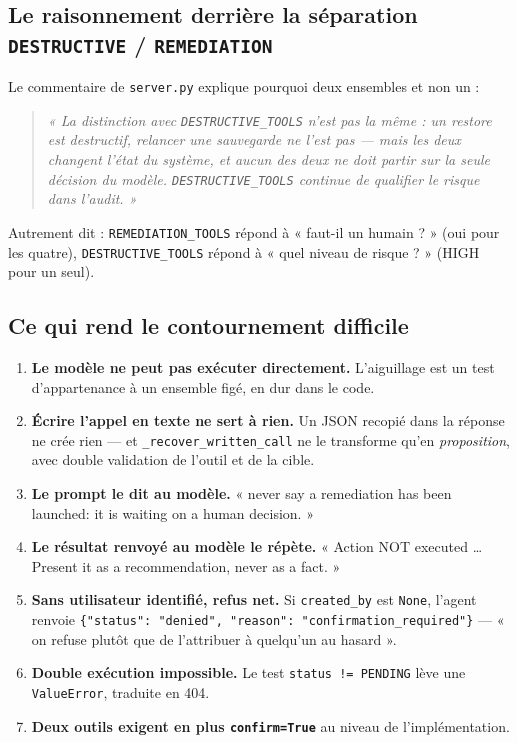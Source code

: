 \documentclass[11pt,a4paper]{report}
\newcommand{\file}[1]{\texttt{\small #1}}
\newcommand{\fn}[1]{\texttt{\small\textcolor{oasisviolet}{#1}}}
\newcommand{\cls}[1]{\texttt{\small\textcolor{oasisblue}{#1}}}
\begin{document}
\subsection{Le raisonnement derrière la séparation \texttt{DESTRUCTIVE} / \texttt{REMEDIATION}}

Le commentaire de \file{server.py} explique pourquoi deux ensembles et non un :

\begin{quote}
\itshape
« La distinction avec \texttt{DESTRUCTIVE\_TOOLS} n'est pas la même : un restore
est destructif, relancer une sauvegarde ne l'est pas --- mais les deux changent
l'état du système, et aucun des deux ne doit partir sur la seule décision du
modèle. \texttt{DESTRUCTIVE\_TOOLS} continue de qualifier le risque dans
l'audit. »
\end{quote}

\noindent
Autrement dit : \texttt{REMEDIATION\_TOOLS} répond à « faut-il un humain ? »
(oui pour les quatre), \texttt{DESTRUCTIVE\_TOOLS} répond à « quel niveau de
risque ? » (HIGH pour un seul).

\subsection{Ce qui rend le contournement difficile}

\begin{enumerate}
  \item \textbf{Le modèle ne peut pas exécuter directement.} L'aiguillage est un
  test d'appartenance à un ensemble figé, en dur dans le code.
  \item \textbf{Écrire l'appel en texte ne sert à rien.} Un JSON recopié dans la
  réponse ne crée rien --- et \fn{\_recover\_written\_call} ne le transforme
  qu'en \emph{proposition}, avec double validation de l'outil et de la cible.
  \item \textbf{Le prompt le dit au modèle.} « never say a remediation has been
  launched: it is waiting on a human decision. »
  \item \textbf{Le résultat renvoyé au modèle le répète.} « Action NOT executed
  \ldots{} Present it as a recommendation, never as a fact. »
  \item \textbf{Sans utilisateur identifié, refus net.} Si \texttt{created\_by}
  est \texttt{None}, l'agent renvoie
  \texttt{\{"status": "denied", "reason": "confirmation\_required"\}} --- « on
  refuse plutôt que de l'attribuer à quelqu'un au hasard ».
  \item \textbf{Double exécution impossible.} Le test
  \texttt{status != PENDING} lève une \cls{ValueError}, traduite en 404.
  \item \textbf{Deux outils exigent en plus \texttt{confirm=True}} au niveau de
  l'implémentation.
\end{enumerate}
\end{document}
